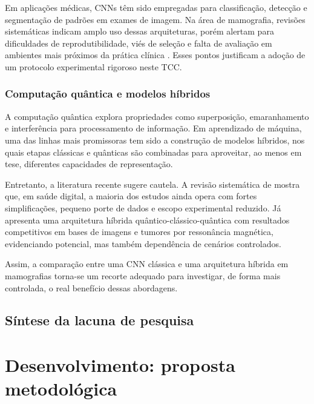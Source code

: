 \documentclass[
    12pt,
    openright,
    oneside,
    a4paper,
    english,
    brazil
]{abntex2}
\begin{document}
Em aplicações médicas, CNNs têm sido empregadas para classificação, detecção e segmentação de padrões em exames de imagem. Na área de mamografia, revisões sistemáticas indicam amplo uso dessas arquiteturas, porém alertam para dificuldades de reprodutibilidade, viés de seleção e falta de avaliação em ambientes mais próximos da prática clínica \cite{Bhalla2023MammographyReview}. Esses pontos justificam a adoção de um protocolo experimental rigoroso neste TCC.

\subsection{Computação quântica e modelos híbridos}

A computação quântica explora propriedades como superposição, emaranhamento e interferência para processamento de informação. Em aprendizado de máquina, uma das linhas mais promissoras tem sido a construção de modelos híbridos, nos quais etapas clássicas e quânticas são combinadas para aproveitar, ao menos em tese, diferentes capacidades de representação.

Entretanto, a literatura recente sugere cautela. A revisão sistemática de  mostra que, em saúde digital, a maioria dos estudos ainda opera com fortes simplificações, pequeno porte de dados e escopo experimental reduzido. Já  apresenta uma arquitetura híbrida quântico-clássico-quântica com resultados competitivos em bases de imagens e tumores por ressonância magnética, evidenciando potencial, mas também dependência de cenários controlados.

Assim, a comparação entre uma CNN clássica e uma arquitetura híbrida em mamografias torna-se um recorte adequado para investigar, de forma mais controlada, o real benefício dessas abordagens.

\section{Síntese da lacuna de pesquisa}



\chapter{Desenvolvimento: proposta metodológica}
\end{document}
